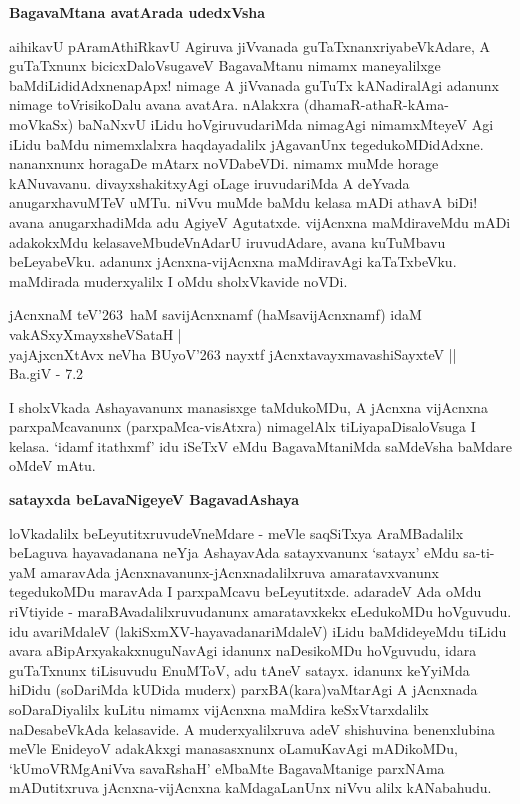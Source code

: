 {\bigskip
\noindent
{\large\bf BagavaMtana avatArada udedxVsha}}\label{page72a}
\medskip

\noindent
aihikavU pAramAthiRkavU Agiruva jiVvanada guTaTxnanxriyabeVkAdare, A guTaTxnunx bicicxDaloVsugaveV BagavaMtanu nimamx maneyalilxge baMdiLididAdxnenapApx! nimage A jiVvanada guTuTx kANadiralAgi adanunx nimage toVrisikoDalu avana avatAra. nAlakxra (dhamaR-athaR-kAma-moVkaSx) baNaNxvU iLidu hoVgiruvudariMda nimagAgi nimamxMteyeV Agi iLidu baMdu nimemxlalxra haqdayadalilx jAgavanUnx tegedukoMDidAdxne. nananxnunx horagaDe mAtarx noVDabeVDi. nimamx muMde horage kANuvavanu. divayxshakitxyAgi oLage iruvudariMda A deYvada anugarxhavuMTeV uMTu. niVvu muMde baMdu kelasa mADi athavA biDi! avana anugarxhadiMda adu AgiyeV Agutatxde. vijAcnxna maMdiraveMdu mADi adakokxMdu kelasaveMbudeVnAdarU iruvudAdare, avana kuTuMbavu beLeyabeVku. adanunx jAcnxna-vijAcnxna maMdiravAgi kaTaTxbeVku. maMdirada muderxyalilx I oMdu sholxVkavide noVDi.

\begin{shloka}
jAcnxnaM teV\char'263 \,haM savijAcnxnamf (haMsavijAcnxnamf) idaM vakASxyXmayxsheVSataH |\\\label{72}
yajAjxcnXtAvx neVha BUyoV\char'263 nayxtf jAcnxtavayxmavashiSayxteV ||\\
 \hfill{Ba.giV - 7.2}
\end{shloka}

\noindent
I sholxVkada Ashayavanunx manasisxge taMdukoMDu, A jAcnxna vijAcnxna parxpaMcavanunx (parxpaMca-visAtxra) nimagelAlx tiLiyapaDisaloVsuga I kelasa. `idamf itathxmf' idu iSeTxV eMdu BagavaMtaniMda saMdeVsha baMdare oMdeV mAtu.

{\bigskip
\noindent
{\large\bf satayxda beLavaNigeyeV BagavadAshaya}}\label{page72b}
\medskip

\noindent
loVkadalilx beLeyutitxruvudeVneMdare - meVle saqSiTxya AraMBadalilx beLaguva hayavadanana neYja AshayavAda satayxvanunx `satayx' eMdu sa-ti-yaM amaravAda jAcnxnavanunx-jAcnxnadalilxruva amaratavxvanunx tegedukoMDu maravAda I parxpaMcavu beLeyutitxde. adaradeV Ada oMdu riVtiyide - maraBAvadalilxruvudanunx amaratavxkekx eLedukoMDu hoVguvudu. idu avariMdaleV (lakiSxmXV-hayavadanariMdaleV) iLidu baMdideyeMdu tiLidu avara aBipArxyakakxnuguNavAgi idanunx naDesikoMDu hoVguvudu, idara guTaTxnunx tiLisuvudu EnuMToV, adu tAneV satayx. idanunx keYyiMda hiDidu (soDariMda kUDida muderx) parxBA(kara)vaMtarAgi A jAcnxnada soDaraDiyalilx kuLitu nimamx vijAcnxna maMdira keSxVtarxdalilx naDesabeVkAda kelasavide. A muderxyalilxruva adeV shishuvina benenxlubina meVle EnideyoV adakAkxgi manasasxnunx oLamuKavAgi mADikoMDu, `kUmoVRMgAniVva savaRshaH'\label{73} eMbaMte BagavaMtanige parxNAma mADutitxruva jAcnxna-vijAcnxna kaMdagaLanUnx niVvu alilx kANabahudu.

